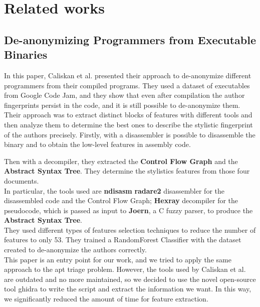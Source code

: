 \chapter{Related works}
\section{De-anonymizing Programmers from Executable Binaries}
In this paper, Caliskan et al. presented their approach to de-anonymize different programmers from their compiled programs. They used a dataset of executables from Google Code Jam, and they show that even after compilation the author fingerprints persist in the code, and it is still possible to de-anonymize them.\\

Their approach was to extract distinct blocks of features with different tools and then analyze them to determine the best ones to describe the stylistic fingerprint of the authors precisely. Firstly,  with a disassembler is possible to disassemble the binary and to obtain the low-level features in assembly code.

Then with a decompiler, they extracted the \textbf{Control Flow Graph} and the \textbf{Abstract Syntax Tree}. They determine the stylistics features from those four documents.
\\
In particular, the tools used are \textbf{ndisasm} \textbf{radare2} disassembler for the disassembled code and the Control Flow Graph; \textbf{Hexray} decompiler for the pseudocode, which is passed as input to \textbf{Joern}, a C fuzzy parser, to produce the  \textbf{Abstract Syntax Tree}.\\

They used different types of features selection techniques to reduce the number of features to only 53. They trained a RandomForest Classifier with the dataset created to de-anonymize the authors correctly. \\

This paper is an entry point for our work, and we tried to apply the same approach to the apt triage problem. However, the tools used by Caliskan et al. are outdated and no more maintained, so we decided to use the novel open-source tool ghidra to write the script and extract the information we want. In this way, we significantly reduced the amount of time for feature extraction.

